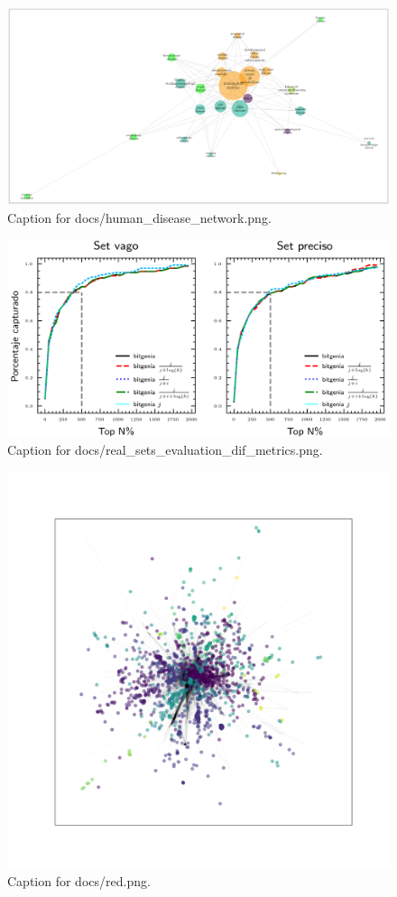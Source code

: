\documentclass{article}
\begin{document}
\begin{figure}[h] \centering \includegraphics{docs/human_disease_network.png} \caption{Caption for docs/human_disease_network.png.} \end{figure}
\begin{figure}[h] \centering \includegraphics{docs/real_sets_evaluation_dif_metrics.png} \caption{Caption for docs/real_sets_evaluation_dif_metrics.png.} \end{figure}
\begin{figure}[h] \centering \includegraphics{docs/red.png} \caption{Caption for docs/red.png.} \end{figure}
\end{document}
